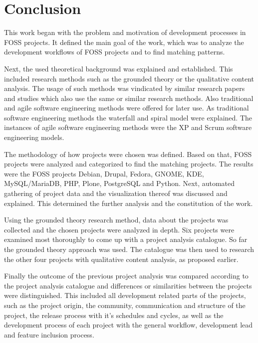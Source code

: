 \chapter{Conclusion} %
\label{chap:conclusion}

This work began with the problem and motivation of development processes in
\ac{FOSS} projects. It defined the main goal of the work, which was to analyze
the development workflows of \ac{FOSS} projects and to find matching patterns.

Next, the used theoretical background was explained and established. This
included research methods such as the grounded theory or the qualitative
content analysis. The usage of such methods was vindicated by similar research
papers and studies which also use the same or similar research methods. Also
traditional and agile software engineering methods were offered for later use.
As traditional software engineering methods the waterfall and spiral model were
explained. The instances of agile software engineering methods were the
\acl{XP} and Scrum software engineering models.

The methodology of how projects were chosen was defined. Based on that,
\ac{FOSS} projects were analyzed and categorized to find the matching projects.
The results were the \ac{FOSS} projects Debian, Drupal, Fedora, GNOME, KDE,
MySQL/MariaDB, PHP, Plone, PostgreSQL and Python. Next, automated gathering of
project data and the visualization thereof was discussed and explained. This
determined the further analysis and the constitution of the work.

Using the grounded theory research method, data about the projects was
collected and the chosen projects were analyzed in depth. Six projects were
examined most thoroughly to come up with a project analysis catalogue. So far
the grounded theory approach was used. The catalogue was then used to research
the other four projects with qualitative content analysis, as proposed earlier.

Finally the outcome of the previous project analysis was compared according to
the project analysis catalogue and differences or similarities between the
projects were distinguished. This included all development related parts of the
projects, such as the project origin, the community, communication and
structure of the project, the release process with it's schedules and cycles,
as well as the development process of each project with the general workflow,
development lead and feature inclusion process.

